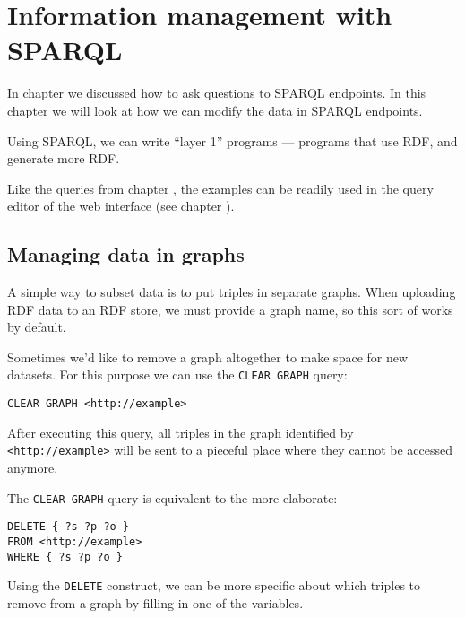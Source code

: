 \chapter{Information management with SPARQL}

  In chapter  we discussed how to ask
  questions to SPARQL endpoints.  In this chapter we will look at how we can
  modify the data in SPARQL endpoints.

  Using SPARQL, we can write ``layer 1'' programs --- programs that use RDF,
  and generate more RDF.

  Like the queries from chapter , the
  examples can be readily used in the query editor of the web interface (see
  chapter ).

\section{Managing data in graphs}

  A simple way to subset data is to put triples in separate graphs.  When
  uploading RDF data to an RDF store, we must provide a graph name, so this
  sort of works by default.

  Sometimes we'd like to remove a graph altogether to make space for new
  datasets.  For this purpose we can use the \texttt{CLEAR GRAPH} query:

\begin{siderules}
\begin{verbatim}
CLEAR GRAPH <http://example>
\end{verbatim}
\end{siderules}

  After executing this query, all triples in the graph identified by
  \texttt{<http://example>} will be sent to a pieceful place where they
  cannot be accessed anymore.

  The \texttt{CLEAR GRAPH} query is equivalent to the more elaborate:

\begin{siderules}
\begin{verbatim}
DELETE { ?s ?p ?o }
FROM <http://example>
WHERE { ?s ?p ?o }
\end{verbatim}
\end{siderules}

  Using the \texttt{DELETE} construct, we can be more specific about which
  triples to remove from a graph by filling in one of the variables.

